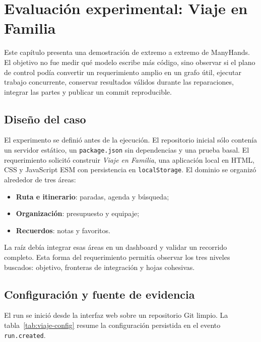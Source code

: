 \chapter{Evaluación experimental: Viaje en Familia}
\label{cap:evaluacion}

Este capítulo presenta una demostración de extremo a extremo de ManyHands. El
objetivo no fue medir qué modelo escribe más código, sino observar si el plano
de control podía convertir un requerimiento amplio en un grafo útil, ejecutar
trabajo concurrente, conservar resultados válidos durante las reparaciones,
integrar las partes y publicar un commit reproducible.

\section{Diseño del caso}

El experimento se definió antes de la ejecución. El repositorio inicial sólo
contenía un servidor estático, un \texttt{package.json} sin dependencias y una
prueba basal. El requerimiento solicitó construir \emph{Viaje en Familia}, una
aplicación local en HTML, CSS y JavaScript ESM con persistencia en
\texttt{localStorage}. El dominio se organizó alrededor de tres áreas:

\begin{itemize}
  \item \textbf{Ruta e itinerario}: paradas, agenda y búsqueda;
  \item \textbf{Organización}: presupuesto y equipaje;
  \item \textbf{Recuerdos}: notas y favoritos.
\end{itemize}

La raíz debía integrar esas áreas en un dashboard y validar un recorrido
completo. Esta forma del requerimiento permitía observar los tres niveles
buscados: objetivo, fronteras de integración y hojas cohesivas.

\section{Configuración y fuente de evidencia}

El run se inició desde la interfaz web sobre un repositorio Git limpio. La
tabla~\ref{tab:viaje-config} resume la configuración persistida en el evento
\texttt{run.created}.

